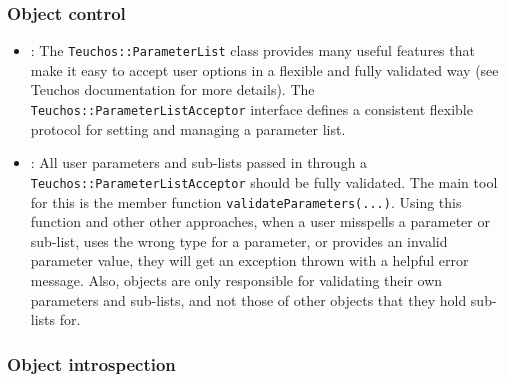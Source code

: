 %
\subsubsection{Object control}
%


\begin{itemize}


{}\item\GCGTeuchosParamterListAcceptor: The
{}\texttt{Teuchos\-::Parameter\-List} class provides many useful features that
make it easy to accept user options in a flexible and fully validated way (see
Teuchos documentation for more details).  The
{}\texttt{Teuchos\-::Parameter\-List\-Acceptor} interface defines a consistent
flexible protocol for setting and managing a parameter list.


{}\item\GCGTeuchosParamterListValidation: All user parameters and
sub-lists passed in through a
{}\texttt{Teuchos\-::Parameter\-List\-Acceptor} should be fully
validated.  The main tool for this is the member function
{}\texttt{validateParameters(...)}.  Using this function and other
other approaches, when a user misspells a parameter or sub-list, uses
the wrong type for a parameter, or provides an invalid parameter
value, they will get an exception thrown with a helpful error message.
Also, objects are only responsible for validating their own parameters
and sub-lists, and not those of other objects that they hold sub-lists
for.


\end{itemize}


%
\subsubsection{Object introspection}
%



